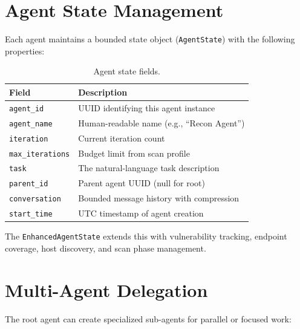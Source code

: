 \documentclass[12pt,a4paper,twoside]{report}
\begin{document}
\section{Agent State Management}

Each agent maintains a bounded state object (\texttt{AgentState}) with the following properties:

\begin{table}[H]
\centering
\caption{Agent state fields.}
\label{tab:state}
\begin{tabularx}{\textwidth}{lX}
\toprule
\textbf{Field} & \textbf{Description} \\
\midrule
\texttt{agent\_id}       & UUID identifying this agent instance \\
\texttt{agent\_name}     & Human-readable name (e.g., ``Recon Agent'') \\
\texttt{iteration}       & Current iteration count \\
\texttt{max\_iterations} & Budget limit from scan profile \\
\texttt{task}            & The natural-language task description \\
\texttt{parent\_id}      & Parent agent UUID (null for root) \\
\texttt{conversation}    & Bounded message history with compression \\
\texttt{start\_time}     & UTC timestamp of agent creation \\
\bottomrule
\end{tabularx}
\end{table}

The \texttt{EnhancedAgentState} extends this with vulnerability tracking, endpoint coverage, host discovery, and scan phase management.

\section{Multi-Agent Delegation}

The root agent can create specialized sub-agents for parallel or focused work:
\end{document}
